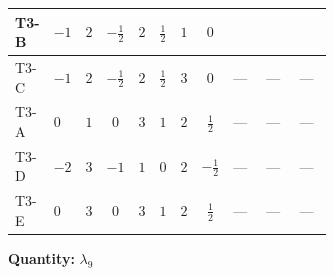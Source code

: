 \documentclass[8pt]{article}
\begin{document}
\begin{landscape}
\begin{longtable}{@{}llcccccc >{\raggedright\arraybackslash}p{0.21\linewidth} >{\raggedright\arraybackslash}p{0.21\linewidth} >{\raggedright\arraybackslash}p{0.21\linewidth}@{}}
T3-B & $-1$ & $2$ & $-\frac{1}{2}$ & $2$ & $\frac{1}{2}$ & $1$ & $0$ & \scriptsize\adjustbox{max width=\linewidth}{$\begin{gathered} {\lambda_{9}} (2 T_{\nu}^{(1)}+2 T_{\nu}^{(2)})\end{gathered}$} & \scriptsize\adjustbox{max width=\linewidth}{$\begin{gathered} +{\lambda_{10}} (\operatorname{Tr}\!\left({y_2}\,\left({y_1}\right)^{\dagger}\right)+2 {\lambda_{11}})\end{gathered}$} & \scriptsize\adjustbox{max width=\linewidth}{$\begin{gathered} +{\lambda_{11}} \operatorname{Tr}\!\left({y_2}\,\left({y_1}\right)^{\dagger}\right)\end{gathered}$} \\
\midrule
T3-C & $-1$ & $2$ & $-\frac{1}{2}$ & $2$ & $\frac{1}{2}$ & $3$ & $0$ & --- & --- & --- \\
\midrule
T3-A & $0$ & $1$ & $0$ & $3$ & $1$ & $2$ & $\frac{1}{2}$ & --- & --- & --- \\
\midrule
T3-D & $-2$ & $3$ & $-1$ & $1$ & $0$ & $2$ & $-\frac{1}{2}$ & --- & --- & --- \\
\midrule
T3-E & $0$ & $3$ & $0$ & $3$ & $1$ & $2$ & $\frac{1}{2}$ & --- & --- & --- \\
\midrule
\bottomrule
\end{longtable}
\clearpage
\noindent\textbf{Quantity: }$\lambda_{9}$\par\smallskip

\end{landscape}
\end{document}
